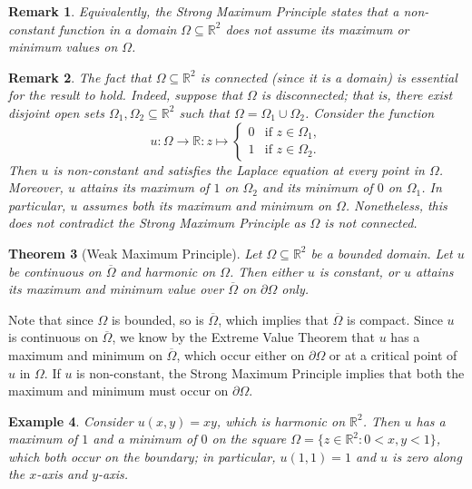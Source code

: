 \documentclass[10pt]{article}
\makeatletter
\newcommand{\R}{\mathbb{R}}
\theoremstyle{newstyle}
\newtheorem{thm}{Theorem}[section]
\newtheorem{remark}[thm]{Remark}
\newtheorem{exmp}[thm]{Example}
\newenvironment{pf}[1][\proofname]{\par
  \pushQED{\qed}%
  \normalfont \topsep0\p@\relax
  \trivlist
  \item[\hskip\labelsep\scshape
  #1\@addpunct{.}]\ignorespaces
}{%
  \popQED\endtrivlist\@endpefalse
}
\makeatother
\begin{document}
\begin{remark}
Equivalently, the Strong Maximum Principle states that a non-constant function in a domain 
$\Omega \subseteq \R^2$ does not assume its maximum or minimum values on $\Omega$. 
\end{remark}

\begin{remark}
The fact that $\Omega \subseteq \R^2$ is connected (since it is a domain) is essential for the 
result to hold. Indeed, suppose that $\Omega$ is disconnected; that is, 
there exist disjoint open sets $\Omega_1, \Omega_2 \subseteq \R^2$ such that $\Omega = 
\Omega_1 \cup \Omega_2$. Consider the function 
\[ u : \Omega \to \R : z \mapsto \begin{cases} 0 & \text{if } z \in \Omega_1, \\ 
1 & \text{if } z \in \Omega_2. \end{cases} \]
Then $u$ is non-constant and satisfies the Laplace equation at every point in $\Omega$. 
Moreover, $u$ attains its maximum of $1$ on $\Omega_2$ and its minimum of $0$ on 
$\Omega_1$. In particular, $u$ assumes both its maximum and minimum on $\Omega$. 
Nonetheless, this does not contradict the Strong Maximum Principle as $\Omega$ is not connected.
\end{remark}

\begin{thm}[Weak Maximum Principle]
Let $\Omega \subseteq \R^2$ be a bounded domain. Let $u$ be continuous on $\overline\Omega$
and harmonic on $\Omega$. Then either $u$ is constant, or $u$ attains its maximum and 
minimum value over $\overline\Omega$ on $\partial\Omega$ only. 
\end{thm}
\begin{pf}
Note that since $\Omega$ is bounded, so is $\overline\Omega$, which implies that 
$\overline\Omega$ is compact. Since $u$ is continuous on $\overline\Omega$, 
we know by the Extreme Value Theorem that $u$ has a maximum and minimum on $\overline\Omega$, 
which occur either on $\partial\Omega$ or at a critical point of $u$ in $\Omega$. 
If $u$ is non-constant, the Strong Maximum Principle implies that both the maximum and 
minimum must occur on $\partial\Omega$. 
\end{pf}

\begin{exmp}
Consider $u(x, y) = xy$, which is harmonic on $\R^2$. Then $u$ has a maximum of $1$ and 
a minimum of $0$ on the square $\Omega = \{z \in \R^2 : 0 < x, y < 1\}$, which both occur 
on the boundary; in particular, $u(1, 1) = 1$ and $u$ is zero along the $x$-axis and $y$-axis.
\end{exmp}
\end{document}
